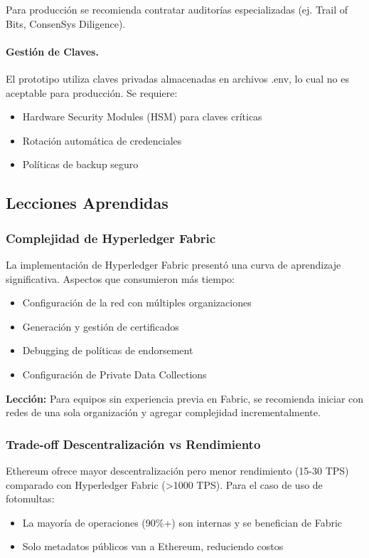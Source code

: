 Para producción se recomienda contratar auditorías especializadas (ej. Trail of Bits, ConsenSys Diligence).

\paragraph{Gestión de Claves.}
El prototipo utiliza claves privadas almacenadas en archivos .env, lo cual no es aceptable para producción. Se requiere:
\begin{itemize}
    \item Hardware Security Modules (HSM) para claves críticas
    \item Rotación automática de credenciales
    \item Políticas de backup seguro
\end{itemize}

\subsection{Lecciones Aprendidas}

\subsubsection{Complejidad de Hyperledger Fabric}

La implementación de Hyperledger Fabric presentó una curva de aprendizaje significativa. Aspectos que consumieron más tiempo:
\begin{itemize}
    \item Configuración de la red con múltiples organizaciones
    \item Generación y gestión de certificados
    \item Debugging de políticas de endorsement
    \item Configuración de Private Data Collections
\end{itemize}

\textbf{Lección:} Para equipos sin experiencia previa en Fabric, se recomienda iniciar con redes de una sola organización y agregar complejidad incrementalmente.

\subsubsection{Trade-off Descentralización vs Rendimiento}

Ethereum ofrece mayor descentralización pero menor rendimiento (15-30 TPS) comparado con Hyperledger Fabric (>1000 TPS). Para el caso de uso de fotomultas:
\begin{itemize}
    \item La mayoría de operaciones (90\%+) son internas y se benefician de Fabric
    \item Solo metadatos públicos van a Ethereum, reduciendo costos
\end{itemize}

